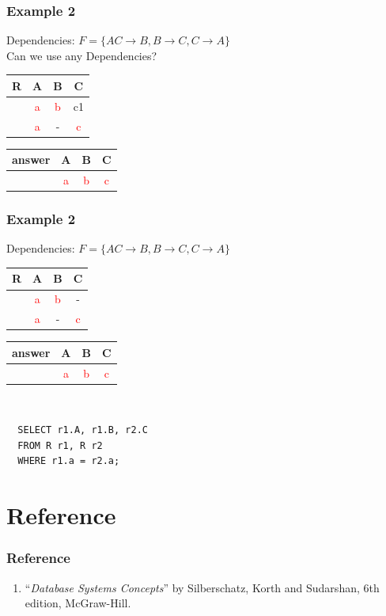 \documentclass{beamer}
\begin{document}
\begin{frame}
  \frametitle{Example 2}
  Dependencies: $F = \{AC \rightarrow B, B \rightarrow C, C \rightarrow A \}$\\
  Can we use any Dependencies?\\
  \begin{tabular}{ c | c c c}
  R & A & B & C \\
  \hline
  & \textcolor{red}{a}  & \textcolor{red}{b} & c1 \\
  & \textcolor{red}{a}  & - & \textcolor{red}{c} \\
  \end{tabular}
  \begin{tabular}{ c | c c c}
  answer & A & B & C \\
  \hline
   & \textcolor{red}{a}& \textcolor{red}{b}& \textcolor{red}{c}\\
  \end{tabular}
\end{frame}
\begin{frame}[fragile]
  \frametitle{Example 2}
  Dependencies: $F = \{AC \rightarrow B, B \rightarrow C, C \rightarrow A \}$\\
  \begin{tabular}{ c | c c c}
  R & A & B & C \\
  \hline
  & \textcolor{red}{a}  & \textcolor{red}{b} & - \\
  & \textcolor{red}{a}  & - & \textcolor{red}{c} \\
  \end{tabular}
  \begin{tabular}{ c | c c c}
  answer & A & B & C \\
  \hline
   & \textcolor{red}{a}& \textcolor{red}{b}& \textcolor{red}{c}\\
  \end{tabular}
  \hfill \\
\begin{verbatim} 
  SELECT r1.A, r1.B, r2.C
  FROM R r1, R r2
  WHERE r1.a = r2.a;
\end{verbatim}  
\end{frame}

\section{Reference}
\begin{frame}[fragile]
\frametitle{Reference}
\begin{enumerate}
\item ``\textit{Database Systems Concepts}'' by Silberschatz, Korth and Sudarshan, 6th edition, McGraw-Hill.
\end{enumerate}
\end{frame}
\end{document}
